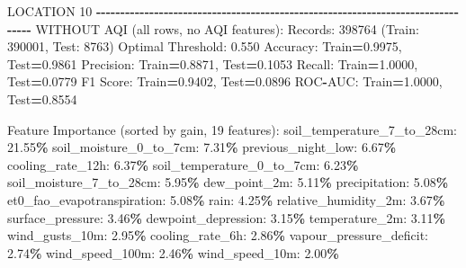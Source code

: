 \documentclass[
  letterpaper,
  DIV=11,
  numbers=noendperiod]{scrartcl}
\newenvironment{Shaded}{\begin{snugshade}}{\end{snugshade}}
\newcommand{\BuiltInTok}[1]{#1}
\newcommand{\DecValTok}[1]{\textcolor[rgb]{0.00,0.00,0.81}{#1}}
\newcommand{\FloatTok}[1]{\textcolor[rgb]{0.00,0.00,0.81}{#1}}
\newcommand{\NormalTok}[1]{#1}
\newcommand{\OperatorTok}[1]{\textcolor[rgb]{0.81,0.36,0.00}{\textbf{#1}}}
\begin{document}
\begin{Shaded}
\begin{Highlighting}[]
\NormalTok{LOCATION }\DecValTok{10}
\OperatorTok{{-}{-}{-}{-}{-}{-}{-}{-}{-}{-}{-}{-}{-}{-}{-}{-}{-}{-}{-}{-}{-}{-}{-}{-}{-}{-}{-}{-}{-}{-}{-}{-}{-}{-}{-}{-}{-}{-}{-}{-}{-}{-}{-}{-}{-}{-}{-}{-}{-}{-}{-}{-}{-}{-}{-}{-}{-}{-}{-}{-}{-}{-}{-}{-}{-}{-}{-}{-}{-}{-}{-}{-}{-}{-}{-}{-}{-}{-}{-}{-}}
\NormalTok{WITHOUT AQI (}\BuiltInTok{all}\NormalTok{ rows, no AQI features):}
\NormalTok{  Records: }\DecValTok{398764}\NormalTok{ (Train: }\DecValTok{390001}\NormalTok{, Test: }\DecValTok{8763}\NormalTok{)}
\NormalTok{  Optimal Threshold: }\FloatTok{0.550}
\NormalTok{  Accuracy: Train}\OperatorTok{=}\FloatTok{0.9975}\NormalTok{, Test}\OperatorTok{=}\FloatTok{0.9861}
\NormalTok{  Precision: Train}\OperatorTok{=}\FloatTok{0.8871}\NormalTok{, Test}\OperatorTok{=}\FloatTok{0.1053}
\NormalTok{  Recall: Train}\OperatorTok{=}\FloatTok{1.0000}\NormalTok{, Test}\OperatorTok{=}\FloatTok{0.0779}
\NormalTok{  F1 Score: Train}\OperatorTok{=}\FloatTok{0.9402}\NormalTok{, Test}\OperatorTok{=}\FloatTok{0.0896}
\NormalTok{  ROC}\OperatorTok{{-}}\NormalTok{AUC: Train}\OperatorTok{=}\FloatTok{1.0000}\NormalTok{, Test}\OperatorTok{=}\FloatTok{0.8554}

\NormalTok{  Feature Importance (}\BuiltInTok{sorted}\NormalTok{ by gain, }\DecValTok{19}\NormalTok{ features):}
\NormalTok{    soil\_temperature\_7\_to\_28cm: }\FloatTok{21.55}\OperatorTok{\%}
\NormalTok{    soil\_moisture\_0\_to\_7cm: }\FloatTok{7.31}\OperatorTok{\%}
\NormalTok{    previous\_night\_low: }\FloatTok{6.67}\OperatorTok{\%}
\NormalTok{    cooling\_rate\_12h: }\FloatTok{6.37}\OperatorTok{\%}
\NormalTok{    soil\_temperature\_0\_to\_7cm: }\FloatTok{6.23}\OperatorTok{\%}
\NormalTok{    soil\_moisture\_7\_to\_28cm: }\FloatTok{5.95}\OperatorTok{\%}
\NormalTok{    dew\_point\_2m: }\FloatTok{5.11}\OperatorTok{\%}
\NormalTok{    precipitation: }\FloatTok{5.08}\OperatorTok{\%}
\NormalTok{    et0\_fao\_evapotranspiration: }\FloatTok{5.08}\OperatorTok{\%}
\NormalTok{    rain: }\FloatTok{4.25}\OperatorTok{\%}
\NormalTok{    relative\_humidity\_2m: }\FloatTok{3.67}\OperatorTok{\%}
\NormalTok{    surface\_pressure: }\FloatTok{3.46}\OperatorTok{\%}
\NormalTok{    dewpoint\_depression: }\FloatTok{3.15}\OperatorTok{\%}
\NormalTok{    temperature\_2m: }\FloatTok{3.11}\OperatorTok{\%}
\NormalTok{    wind\_gusts\_10m: }\FloatTok{2.95}\OperatorTok{\%}
\NormalTok{    cooling\_rate\_6h: }\FloatTok{2.86}\OperatorTok{\%}
\NormalTok{    vapour\_pressure\_deficit: }\FloatTok{2.74}\OperatorTok{\%}
\NormalTok{    wind\_speed\_100m: }\FloatTok{2.46}\OperatorTok{\%}
\NormalTok{    wind\_speed\_10m: }\FloatTok{2.00}\OperatorTok{\%}


\end{Highlighting}
\end{Shaded}
\end{document}
